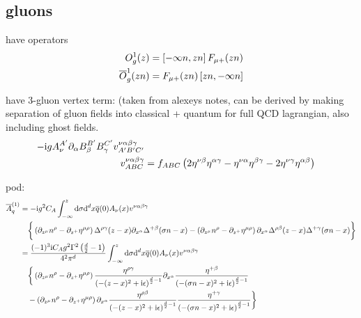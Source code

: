 \ifdefined\mainprogram{}
\else

\fi

\subsection{gluons}
have operators
\begin{align}
	O_{g}^{1}(z) 
	&=
	\left[-\infty n,zn \right] F_{\mu +} (zn)
	\\
	\overline {O}_{g}^{1}(zn) 
	&=
	F_{\mu +}(zn)\left[zn,-\infty n  \right]
\end{align}

have 3-gluon vertex term: (taken from alexeys notes, can be derived by making separation of gluon fields into classical + quantum for full QCD lagrangian, also including ghost fields. 
\begin{align}
	-\text{i} g A_\nu^{A'} \partial_\alpha B_\beta^{B'} B_\gamma^{C'} v^{\nu\alpha\beta\gamma}_{A'B'C'}
	\\
	v^{\nu\alpha\beta\gamma}_{ABC}
	&=f_{ABC}\left(2\eta^{\nu \beta}\eta^{\alpha\gamma} - \eta^{\nu \alpha}\eta^{\beta\gamma} -2\eta^{\nu\gamma}\eta^{\alpha\beta}\right)
\end{align}


pod: 
\begin{align}
	\overline A_q^{(1)}
	&=
	-\text{i} g^2 C_A \int_{-\infty}^z \text{d} \sigma \text{d} ^d x  \overline q(0) A_\nu (x) v^{\nu\alpha\beta\gamma}
	\\&~~~
	\bigg\{ \left( \partial_{z^\mu} n^\rho - \partial_{z^+} \eta^{\mu \rho} \right) \Delta^{\rho \gamma} (z-x) \partial_{x^\alpha} \Delta^{+ \beta}(\sigma n -x) - \left(\partial_{z^\mu} n^\rho - \partial_{z^+} \eta ^{\mu \rho} \right) \partial_{x^\alpha} \Delta^{\rho \beta} (z-x) \Delta^{+\gamma} (\sigma n -x) \bigg\}
	\\
	&=
	\frac{(-1)^3 \text{i} C_A g^2 \Gamma^2\left( \frac{d}{2} -1\right)}{4^2\pi^{d}} \int_{-\infty}^z \text{d} \sigma \text{d} ^d x  \overline q(0) A_\nu (x) v^{\nu\alpha\beta\gamma}
	\\&~~~
	\bigg\{ \left( \partial_{z^\mu} n^\rho - \partial_{z^+} \eta^{\mu \rho} \right) \frac{\eta^{\rho \gamma}}{ \left(-(z-x)^2+\text{i}\epsilon\right)^{\frac{d}{2}-1}} \partial_{x^\alpha} \frac{\eta^{+\beta}}{ \left(-(\sigma n -x)^2+\text{i}\epsilon\right)^{\frac{d}{2}-1}} 
	\\&~~~
	- \left(\partial_{z^\mu} n^\rho - \partial_{z^+} \eta ^{\mu \rho} \right) \partial_{x^\alpha} \frac{\eta^{\rho \beta}}{ \left(-(z-x)^2+\text{i}\epsilon\right)^{\frac{d}{2}-1}} \frac{\eta^{+ \gamma}}{ \left(-(\sigma n -x)^2+\text{i}\epsilon\right)^{\frac{d}{2}-1}} \bigg\}
\end{align}

